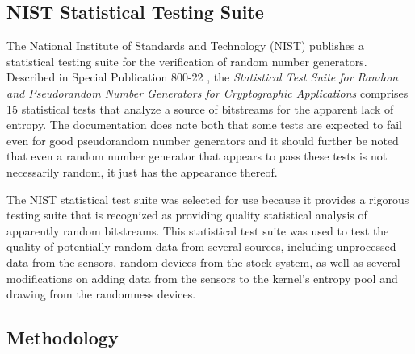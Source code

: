 \subsection{NIST Statistical Testing Suite}

The National Institute of Standards and Technology (NIST) publishes a
statistical testing suite for the verification of random number generators.
Described in Special Publication 800-22 \cite{nist}, the \textit{Statistical
Test Suite for Random and Pseudorandom Number Generators for Cryptographic
Applications} comprises 15 statistical tests that analyze a source of bitstreams
for the apparent lack of entropy. The documentation does note both that some
tests are expected to fail even for good pseudorandom number generators and it
should further be noted that even a random number generator that appears to pass
these tests is not necessarily random, it just has the appearance thereof.

The NIST statistical test suite was selected for use because it provides a
rigorous testing suite that is recognized as providing quality statistical
analysis of apparently random bitstreams. This statistical test suite was used
to test the quality of potentially random data from several sources, including
unprocessed data from the sensors, random devices from the stock system, as well
as several modifications on adding data from the sensors to the kernel's entropy
pool and drawing from the randomness devices.


\subsection{Methodology}

